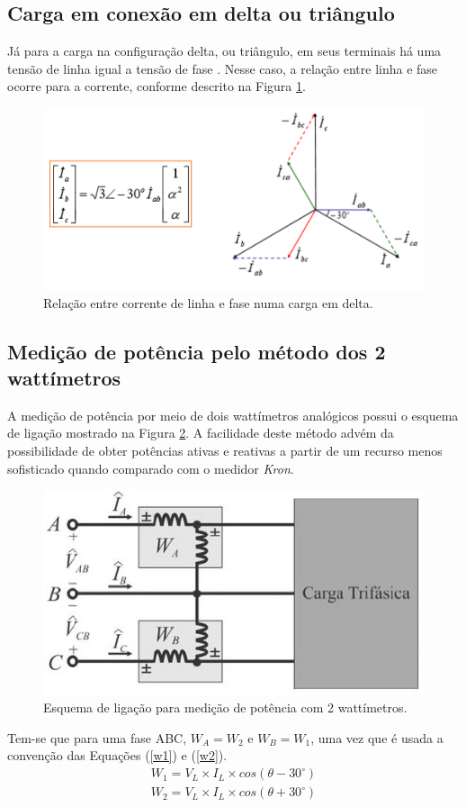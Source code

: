 \documentclass[a4paper,12pt,oneside,openany,table,xcdraw]{article}
\begin{document}
\subsection{Carga em conexão em delta ou triângulo} \label{delta}
Já para a carga na configuração delta, ou triângulo, em seus terminais há uma tensão de linha igual a tensão de fase \cite{irwin}. Nesse caso, a relação entre linha e fase ocorre para a corrente, conforme descrito na Figura \ref{carga-delta}.

\begin{figure}[H]
\centering
\includegraphics[width=14cm]{carga-delta}
\caption{Relação entre corrente de linha e fase numa carga em delta.}
\label{carga-delta}
\end{figure}

\vspace{0.5cm}
\subsection{Medição de potência pelo método dos 2 wattímetros} \label{potencias}
A medição de potência por meio de dois wattímetros analógicos possui o esquema de ligação mostrado na Figura \ref{watt:ligacao}. A facilidade deste método advém da possibilidade de obter potências ativas e reativas a partir de um recurso menos sofisticado quando comparado com o medidor \emph{Kron}.

\begin{figure}[H]
\centering
\includegraphics[width=12cm]{watt}
\caption{Esquema de ligação para medição de potência com 2 wattímetros.}
\label{watt:ligacao}
\end{figure}
Tem-se que para uma fase ABC, $W_A=W_2$ e $W_B=W_1$, uma vez que é usada a convenção das Equações (\ref{w1}) e (\ref{w2}).
\begin{gather}
W_1 = V_L \times I_L \times cos(\theta - 30^\circ)\label{w1}\\
W_2 = V_L \times I_L \times cos(\theta + 30^\circ)\label{w2}
\end{gather}
\end{document}
